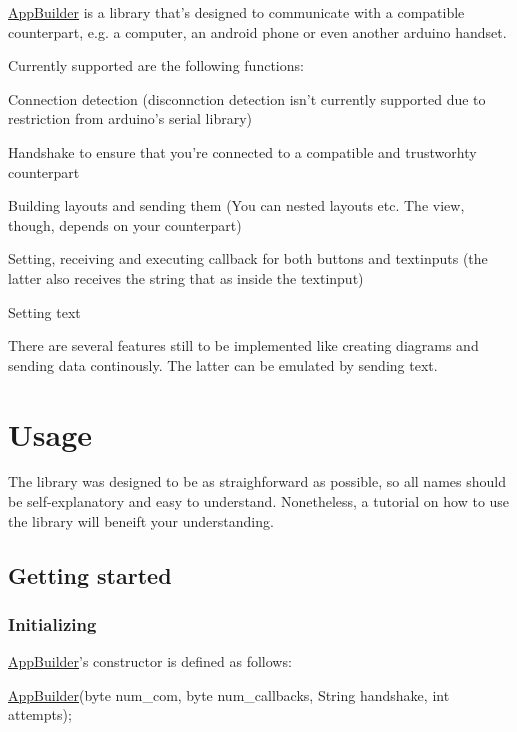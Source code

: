 \hyperlink{class_app_builder}{App\+Builder} is a library that's designed to communicate with a compatible counterpart, e.\+g. a computer, an android phone or even another arduino handset.

Currently supported are the following functions\+:
\begin{DoxyItemize}
\item Connection detection (disconnction detection isn't currently supported due to restriction from arduino's serial library)
\item Handshake to ensure that you're connected to a compatible and trustworhty counterpart
\item Building layouts and sending them (You can nested layouts etc. The view, though, depends on your counterpart)
\item Setting, receiving and executing callback for both buttons and textinputs (the latter also receives the string that as inside the textinput)
\item Setting text
\end{DoxyItemize}

There are several features still to be implemented like creating diagrams and sending data continously. The latter can be emulated by sending text.

\section*{Usage}

The library was designed to be as straighforward as possible, so all names should be self-\/explanatory and easy to understand. Nonetheless, a tutorial on how to use the library will beneift your understanding.

\subsection*{Getting started}

\subsubsection*{Initializing}

\hyperlink{class_app_builder}{App\+Builder}'s constructor is defined as follows\+:


\begin{DoxyCode}
\hyperlink{class_app_builder}{AppBuilder}(byte num\_com, byte num\_callbacks, String handshake, \textcolor{keywordtype}{int} attempts);
\end{DoxyCode}


